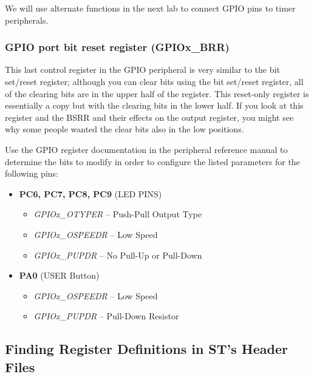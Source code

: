 \documentclass[11pt,fleqn]{book} %
\begin{document}
We will use alternate functions in the next lab to connect GPIO pins to timer peripherals.

\subsubsection{GPIO port bit reset register (GPIOx\_BRR)}
This last control register in the GPIO peripheral is very similar to the bit set/reset register; although you can clear bits using the bit set/reset register, all of the clearing bits are in the upper half of the register. This reset-only register is essentially a copy but with the clearing bits in the lower half. If you look at this register and the BSRR and their effects on the output register, you might see why some people wanted the clear bits also in the low positions.

\begin{exercise}
    
   Use the GPIO register documentation in the peripheral reference manual to determine the bits to modify in order to configure the listed parameters for the following pins:
    
    \begin{itemize}
        \item \textbf{PC6, PC7, PC8, PC9} (LED PINS) 
        \begin{itemize}
            \item \textit{GPIOx\_OTYPER} -- Push-Pull Output Type
            \item \textit{GPIOx\_OSPEEDR} -- Low Speed
            \item \textit{GPIOx\_PUPDR} -- No Pull-Up or Pull-Down
        \end{itemize}
        \item \textbf{PA0} (USER Button)
        \begin{itemize}
            \item \textit{GPIOx\_OSPEEDR} -- Low Speed
            \item \textit{GPIOx\_PUPDR} -- Pull-Down Resistor
        \end{itemize}
    \end{itemize}
\end{exercise}


\subsection{Finding Register Definitions in ST's Header Files}
\end{document}
